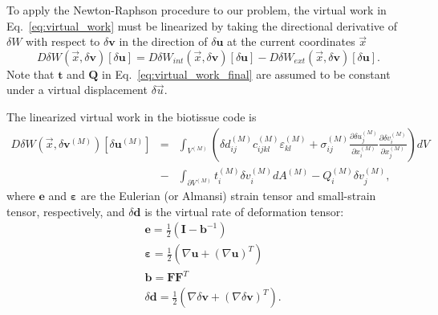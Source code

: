 To apply the Newton-Raphson procedure to our problem, the virtual work in Eq.\ \eqref{eq:virtual_work} must be linearized by taking the directional derivative of $\delta W$ with respect to $\delta \pmb{v}$ in the direction of $\delta \pmb{u}$ at the current coordinates $\vec{x}$
%
\begin{equation}
D\delta W (\vec{x},\delta \pmb{v}) [\delta \pmb{u}] = D\delta W_{int} (\vec{x},\delta \pmb{v}) [\delta \pmb{u}] - D\delta W_{ext} (\vec{x},\delta \pmb{v}) [\delta \pmb{u}].
\end{equation}
%
%
Note that $\pmb{t}$ and $\pmb{Q}$ in Eq.\ \eqref{eq:virtual_work_final} are assumed to be constant under a virtual displacement \(\delta \vec{u}\).

The linearized virtual work in the biotissue code is 
%
\begin{eqnarray}
D\delta W(\vec{x},\delta \pmb{v}^{(M)})[\delta \pmb{u}^{(M)}]  
%
&=& \int_{V^{(M)}} \left(\delta d_{ij}^{(M)} c_{ijkl}^{(M)} \varepsilon_{kl}^{(M)} +  \sigma_{ij}^{(M)} \frac{\partial \delta u_j^{(M)}}{\partial x_i^{(M)}}\frac{\partial \delta v_i^{(M)}}{\partial x_j^{(M)}}\right) d V \nonumber \\
&-& \int_{\partial V^{(M)}} t_i^{(M)} \delta v_i^{(M)} dA^{(M)} - Q_i^{(M)} \delta v_j^{(M)},
\label{eq:virtual_work_linearized}
\end{eqnarray}
%
where $\pmb{e}$ and $\pmb{\varepsilon}$ are the Eulerian (or Almansi) strain tensor and small-strain tensor, respectively, and $\delta \pmb{d}$ is the virtual rate of deformation tensor: 
%
\begin{align}
&\pmb{e} = \frac{1}{2}(\pmb{I} - \pmb{b}^{-1}) \nonumber\\
%
&\pmb{\varepsilon} = \frac{1}{2}\left(\nabla \pmb{u} + (\nabla \pmb{u})^T\right) \nonumber\\
%
&\pmb{b} = \pmb{F}\pmb{F}^T \\
%
&\delta \pmb{d} = \frac{1}{2}\left(\nabla \delta \pmb{v}  + (\nabla \delta \pmb{v})^T\right).
\end{align}
%

